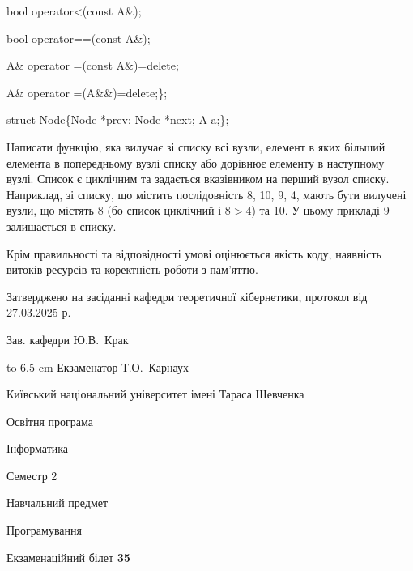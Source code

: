 \documentclass[12pt, ukrainian]{article}
\begin{document}
{\quad  bool operator<(const A\&); 

\quad  bool operator==(const A\&); 

\quad A\& operator =(const A\&)=delete; 

\quad  A\& operator =(A\&\&)=delete;\};

struct Node\{Node *prev; Node *next; A a;\};

Написати функцію, яка вилучає зі списку всі вузли, елемент в яких більший елемента в попередньому вузлі списку або дорівнює елементу в наступному вузлі. Список є циклічним та задається вказівником на перший вузол списку. Наприклад, зі списку, що містить послідовність 8, 10, 9, 4, мають бути вилучені вузли, що містять 8 (бо список циклічний і $8>4$) та 10. У цьому прикладі 9 залишається в списку.

Крім правильності та відповідності умові оцінюється якість коду, наявність витоків ресурсів та коректність роботи з пам'яттю. 

}
{\smallskip\smallskip \begin {scriptsize} Затверджено на засіданні кафедри теоретичної кібернетики, протокол   від   27.03.2025 р.\par\smallskip\smallskip\smallskip\smallskip
{\parbox {6.5 cm} {Зав. кафедри \dotfill Ю.В.~Крак}}\hspace {0.7cm} {\hbox to 6.5 cm { Екзаменатор \dotfill Т.О.~Карнаух}} \end{scriptsize}}
\newpage
{{\begin {scriptsize}\par
{ \center  Київський національний університет імені Тараса Шевченка \par}
{\parbox {5 cm}{Освітня програма \hfill}{\parbox {7 cm}{Інформатика\hfill}}\parbox {6 cm}{\hfill Семестр 2}}\par
{\parbox {5 cm} {Навчальний предмет \hfill}\parbox {7 cm}{Програмування \hfill}\parbox {6cm}{\hfill}\par}\vspace{-15pt} \end{scriptsize}}{\center Екзаменаційний білет \No \textbf { 35 }\par}}
\end{document}
